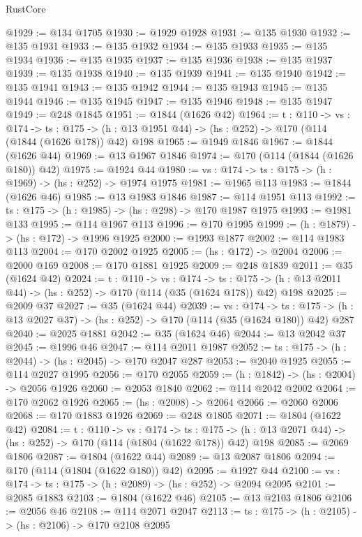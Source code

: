 \begin{lexlean}{RustCore}
\begin{coremodule}
@1929 := @134 @1705
@1930 := @1929 @1928
@1931 := @135 @1930
@1932 := @135 @1931
@1933 := @135 @1932
@1934 := @135 @1933
@1935 := @135 @1934
@1936 := @135 @1935
@1937 := @135 @1936
@1938 := @135 @1937
@1939 := @135 @1938
@1940 := @135 @1939
@1941 := @135 @1940
@1942 := @135 @1941
@1943 := @135 @1942
@1944 := @135 @1943
@1945 := @135 @1944
@1946 := @135 @1945
@1947 := @135 @1946
@1948 := @135 @1947
@1949 := @248 @1845
@1951 := @1844 (@1626 @42)
@1964 := {t : @110} ->
  {vs : @174} ->
  {ts : @175} -> (h : @13 @1951 @44) -> (hs : @252) -> @170 (@114 (@1844 (@1626 @178)) @42) @198
@1965 := @1949 @1846
@1967 := @1844 (@1626 @44)
@1969 := @13 @1967 @1846
@1974 := @170 (@114 (@1844 (@1626 @180)) @42)
@1975 := @1924 @44
@1980 := {vs : @174} -> {ts : @175} -> (h : @1969) -> (hs : @252) -> @1974 @1975
@1981 := @1965 @113
@1983 := @1844 (@1626 @46)
@1985 := @13 @1983 @1846
@1987 := @114 @1951 @113
@1992 := {ts : @175} -> (h : @1985) -> (hs : @298) -> @170 @1987 @1975
@1993 := @1981 @133
@1995 := @114 @1967 @113
@1996 := @170 @1995
@1999 := (h : @1879) -> (hs : @172) -> @1996 @1925
@2000 := @1993 @1877
@2002 := @114 @1983 @113
@2004 := @170 @2002 @1925
@2005 := (hs : @172) -> @2004
@2006 := @2000 @169
@2008 := @170 @1881 @1925
@2009 := @248 @1839
@2011 := @35 (@1624 @42)
@2024 := {t : @110} ->
  {vs : @174} ->
  {ts : @175} -> (h : @13 @2011 @44) -> (hs : @252) -> @170 (@114 (@35 (@1624 @178)) @42) @198
@2025 := @2009 @37
@2027 := @35 (@1624 @44)
@2039 := {vs : @174} ->
  {ts : @175} -> (h : @13 @2027 @37) -> (hs : @252) -> @170 (@114 (@35 (@1624 @180)) @42) @287
@2040 := @2025 @1881
@2042 := @35 (@1624 @46)
@2044 := @13 @2042 @37
@2045 := @1996 @46
@2047 := @114 @2011 @1987
@2052 := {ts : @175} -> (h : @2044) -> (hs : @2045) -> @170 @2047 @287
@2053 := @2040 @1925
@2055 := @114 @2027 @1995
@2056 := @170 @2055
@2059 := (h : @1842) -> (hs : @2004) -> @2056 @1926
@2060 := @2053 @1840
@2062 := @114 @2042 @2002
@2064 := @170 @2062 @1926
@2065 := (hs : @2008) -> @2064
@2066 := @2060 @2006
@2068 := @170 @1883 @1926
@2069 := @248 @1805
@2071 := @1804 (@1622 @42)
@2084 := {t : @110} ->
  {vs : @174} ->
  {ts : @175} -> (h : @13 @2071 @44) -> (hs : @252) -> @170 (@114 (@1804 (@1622 @178)) @42) @198
@2085 := @2069 @1806
@2087 := @1804 (@1622 @44)
@2089 := @13 @2087 @1806
@2094 := @170 (@114 (@1804 (@1622 @180)) @42)
@2095 := @1927 @44
@2100 := {vs : @174} -> {ts : @175} -> (h : @2089) -> (hs : @252) -> @2094 @2095
@2101 := @2085 @1883
@2103 := @1804 (@1622 @46)
@2105 := @13 @2103 @1806
@2106 := @2056 @46
@2108 := @114 @2071 @2047
@2113 := {ts : @175} -> (h : @2105) -> (hs : @2106) -> @170 @2108 @2095

\end{coremodule}
\end{lexlean}
